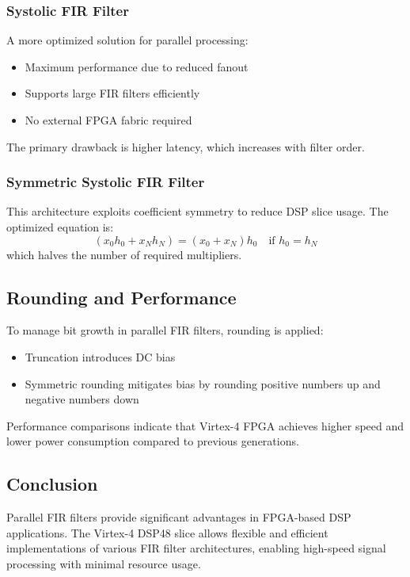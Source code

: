 \documentclass{article}
\begin{document}
	\subsubsection{Systolic FIR Filter}
	A more optimized solution for parallel processing:
	\begin{itemize}
		\item Maximum performance due to reduced fanout
		\item Supports large FIR filters efficiently
		\item No external FPGA fabric required
	\end{itemize}
	The primary drawback is higher latency, which increases with filter order.
	
	\subsubsection{Symmetric Systolic FIR Filter}
	This architecture exploits coefficient symmetry to reduce DSP slice usage. The optimized equation is:
	\begin{equation}
		(x_0 h_0 + x_N h_N) = (x_0 + x_N) h_0 \quad \text{if } h_0 = h_N
	\end{equation}
	which halves the number of required multipliers.
	
	\subsection{Rounding and Performance}
	To manage bit growth in parallel FIR filters, rounding is applied:
	\begin{itemize}
		\item Truncation introduces DC bias
		\item Symmetric rounding mitigates bias by rounding positive numbers up and negative numbers down
	\end{itemize}
	Performance comparisons indicate that Virtex-4 FPGA achieves higher speed and lower power consumption compared to previous generations.
	
	\subsection{Conclusion}
	Parallel FIR filters provide significant advantages in FPGA-based DSP applications. The Virtex-4 DSP48 slice allows flexible and efficient implementations of various FIR filter architectures, enabling high-speed signal processing with minimal resource usage.
	
	
	
\end{document}
